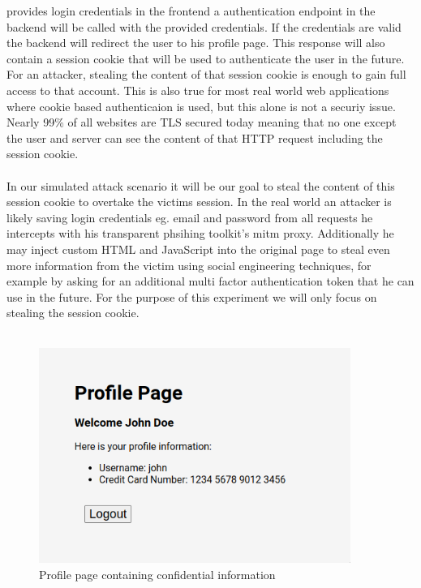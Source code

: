 \documentclass[12pt]{scrbook}
\begin{document}
provides login credentials in the frontend a authentication endpoint in the
backend will be called with the provided credentials. If the credentials are
valid the backend will redirect the user to his profile page. This response will
also contain a session cookie that will be used to authenticate the user in the
future.\\For an attacker, stealing the content of that session cookie is enough
to gain full access to that account. This is also true for most real world web
applications where cookie based authenticaion is used, but this alone is not a
securiy issue. Nearly 99\% of all websites are TLS secured today
\cite{tlsPercentage} meaning that no one except the user and server can see the
content of that HTTP request including the session cookie.\\ \\

In our simulated attack scenario it will be our goal to steal the content of
this session cookie to overtake the victims session. In the real world an
attacker is likely saving login credentials eg. email and password from all
requests he intercepts with his transparent phsihing toolkit's mitm proxy.
Additionally he may inject custom HTML and JavaScript into the original page to
steal even more information from the victim using social engineering techniques,
for example by asking for an additional multi factor authentication token that
he can use in the future. For the purpose of this experiment we will only focus
on stealing the session cookie.\\ \\

\begin{figure}[!htb] \centering
  \includegraphics[height=7cm]{./images/profile_page.png} \caption{Profile page
containing confidential information} \end{figure}
\end{document}
